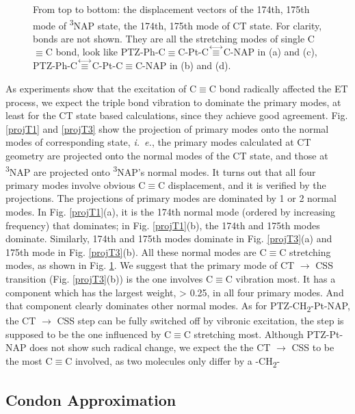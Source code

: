 \begin{figure}[!h]
\caption{From top to bottom: the displacement vectors of the 174th, 175th mode of \textsuperscript{3}NAP state, the 174th, 175th mode of CT state. For clarity, bonds are not shown. They are all the stretching modes of single C$\equiv$C bond, look like
PTZ-Ph-C$\equiv$C-Pt-C$\protect\overset{\longleftrightarrow}{\equiv}$C-NAP in (a) and (c),
PTZ-Ph-C$\protect\overset{\longleftrightarrow}{\equiv}$C-Pt-C$\equiv$C-NAP in (b) and (d).
}\label{NMT1T3}
\end{figure}



As experiments show that the excitation of C$\equiv$C bond radically affected the ET process, we expect the triple bond vibration to dominate the primary modes, at least for the CT state based calculations, since they achieve good agreement. Fig. \ref{projT1} and \ref{projT3} show the projection of primary modes onto the normal modes of corresponding state, {\em i.~e.}, the primary modes calculated at CT geometry are projected onto the normal modes of the CT state, and those at \textsuperscript{3}NAP are projected onto \textsuperscript{3}NAP's normal modes. It turns out that all four primary modes involve obvious C$\equiv$C displacement, and it is verified by the projections. The projections of primary modes are dominated by 1 or 2 normal modes. In Fig. \ref{projT1}(a), it is the 174th normal mode (ordered by increasing frequency) that dominates; in Fig. \ref{projT1}(b), the 174th and 175th modes dominate. Similarly, 174th and 175th modes dominate in Fig. \ref{projT3}(a) and  175th mode in Fig. \ref{projT3}(b). All these normal modes are C$\equiv$C stretching modes, as shown in Fig. \ref{NMT1T3}. We suggest that the primary mode of  CT $\rightarrow$ CSS transition (Fig. \ref{projT3}(b)) is the one involves C$\equiv$C vibration most. It has a component which has the largest weight, > 0.25, in all four primary modes. And that component clearly dominates other normal modes. As for PTZ-CH\textsubscript{2}-Pt-NAP, the CT $\rightarrow$ CSS step can be fully switched off by vibronic excitation, the step is supposed to be the one influenced by C$\equiv$C stretching most. Although PTZ-Pt-NAP does not show such radical change, we expect the the CT $\rightarrow$ CSS to be the most C$\equiv$C involved, as two molecules only differ by a -CH\textsubscript{2}-






\subsection{Condon Approximation}\label{sec:condon}


